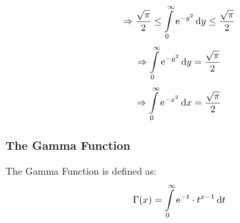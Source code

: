 \documentclass[14]{article}
\theoremstyle{definition}
\theoremstyle{case}
\begin{document}
\[\Rightarrow \dfrac{\sqrt{\pi}}2 \leq \int\limits_0^{\infty} {\rm e}^{-y^2} \dif y \leq \dfrac{\sqrt{\pi}}{2}\]
\[\Rightarrow \int\limits_0^{\infty} {\rm e}^{-y^2} \dif y = \dfrac{\sqrt{\pi}}{2}\]
\[\Rightarrow \int\limits_0^{\infty} {\rm e}^{-x^2} \dif x = \dfrac{\sqrt{\pi}}{2}\]
\pagebreak
\subsubsection{The Gamma Function}
The Gamma Function is defined as:
\[\Gamma(x) = \int\limits_0^{\infty} {\rm e}^{-t} \cdot t^{x-1} \dif t\]
\end{document}
